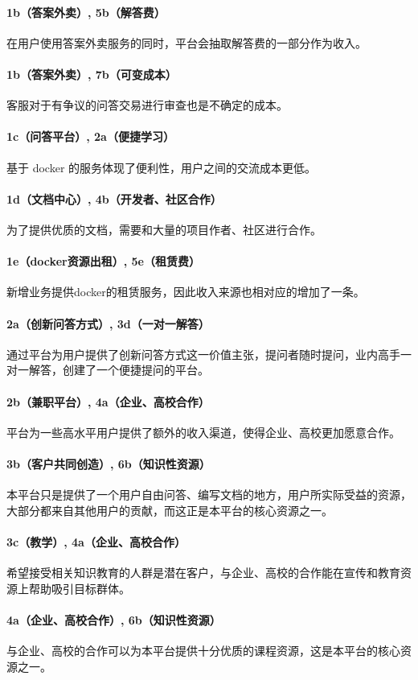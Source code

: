 \documentclass[a4paper]{ctexart}
\begin{document}
\paragraph{1b（答案外卖）, 5b（解答费）}在用户使用答案外卖服务的同时，平台会抽取解答费的一部分作为收入。
\paragraph{1b（答案外卖）, 7b（可变成本）}客服对于有争议的问答交易进行审查也是不确定的成本。
\paragraph{1c（问答平台）, 2a（便捷学习）}基于 docker 的服务体现了便利性，用户之间的交流成本更低。
\paragraph{1d（文档中心）, 4b（开发者、社区合作）}为了提供优质的文档，需要和大量的项目作者、社区进行合作。
\paragraph{1e（docker资源出租）, 5e（租赁费）}新增业务提供docker的租赁服务，因此收入来源也相对应的增加了一条。
\paragraph{2a（创新问答方式）, 3d（一对一解答）}通过平台为用户提供了创新问答方式这一价值主张，提问者随时提问，业内高手一对一解答，创建了一个便捷提问的平台。
\paragraph{2b（兼职平台）, 4a（企业、高校合作）}平台为一些高水平用户提供了额外的收入渠道，使得企业、高校更加愿意合作。
\paragraph{3b（客户共同创造）, 6b（知识性资源）}本平台只是提供了一个用户自由问答、编写文档的地方，用户所实际受益的资源，大部分都来自其他用户的贡献，而这正是本平台的核心资源之一。
\paragraph{3c（教学）, 4a（企业、高校合作）}希望接受相关知识教育的人群是潜在客户，与企业、高校的合作能在宣传和教育资源上帮助吸引目标群体。
\paragraph{4a（企业、高校合作）, 6b（知识性资源）}与企业、高校的合作可以为本平台提供十分优质的课程资源，这是本平台的核心资源之一。
\end{document}
